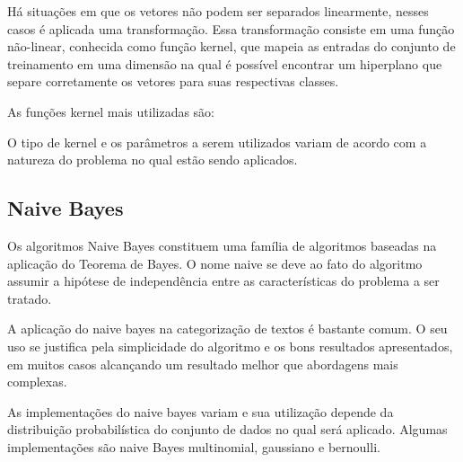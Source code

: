 Há situações em que os vetores não podem ser separados linearmente, nesses casos é aplicada uma transformação. Essa transformação consiste em uma função não-linear, conhecida como função kernel, que mapeia as entradas do conjunto de treinamento em uma dimensão na qual é possível encontrar um hiperplano que separe corretamente os vetores para suas respectivas classes.

As funções kernel mais utilizadas são:





O tipo de kernel e os parâmetros a serem utilizados variam de acordo com a natureza do problema no qual estão sendo aplicados.

\subsection{Naive Bayes}

Os algoritmos Naive Bayes constituem uma família de algoritmos baseadas na aplicação do Teorema de Bayes. O nome naive se deve ao fato do algoritmo assumir a hipótese de independência entre as características do problema a ser tratado.

A aplicação do naive bayes na categorização de textos é bastante comum. O seu uso se justifica pela simplicidade do algoritmo e os bons resultados apresentados, em muitos casos alcançando um resultado melhor que abordagens mais complexas.

As implementações do naive bayes variam e sua utilização depende da distribuição probabilística do conjunto de dados no qual será aplicado. Algumas implementações são naive Bayes multinomial, gaussiano e bernoulli.
